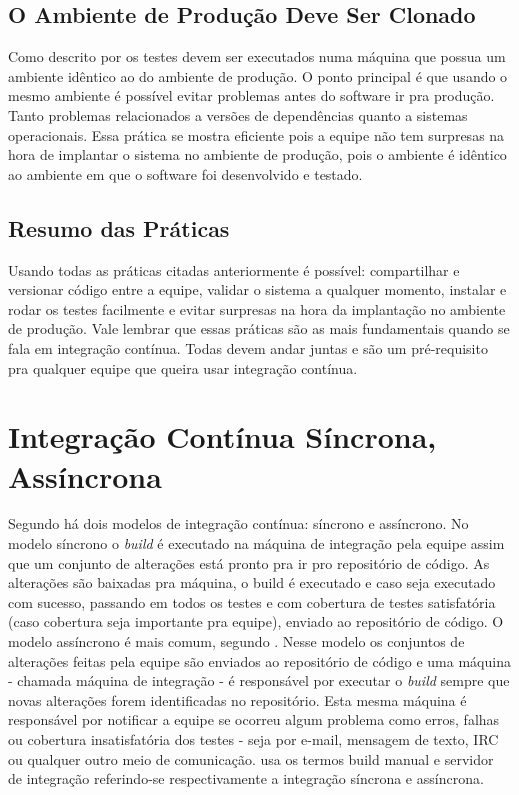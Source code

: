 \documentclass[10pt,a4paper,font=plain]{abnt}
\begin{document}
\subsection{O Ambiente de Produção Deve Ser Clonado}

Como descrito por  os testes devem ser executados numa máquina que possua um ambiente idêntico ao do ambiente de produção. O ponto principal é que usando o mesmo ambiente é possível evitar problemas antes do software ir pra produção. Tanto problemas relacionados a versões de dependências quanto a sistemas operacionais. Essa prática se mostra eficiente pois a equipe não tem surpresas na hora de implantar o sistema no ambiente de produção, pois o ambiente é idêntico ao ambiente em que o software foi desenvolvido e testado.


\subsection{Resumo das Práticas}

Usando todas as práticas citadas anteriormente é possível: compartilhar e versionar código entre a equipe, validar o sistema a qualquer momento, instalar e rodar os testes facilmente e evitar surpresas na hora da implantação no ambiente de produção. Vale lembrar que essas práticas são as mais fundamentais quando se fala em integração contínua. Todas devem andar juntas e são um pré-requisito pra qualquer equipe que queira usar integração contínua.



\section{Integração Contínua Síncrona, Assíncrona}

Segundo  há dois modelos de integração contínua: síncrono e assíncrono.
No modelo síncrono o \textit{build} é executado na máquina de integração pela equipe assim que um conjunto de alterações está pronto pra ir pro repositório de código. As alterações são baixadas pra máquina, o build é executado e caso seja executado com sucesso, passando em todos os testes e com cobertura de testes satisfatória (caso cobertura seja importante pra equipe), enviado ao repositório de código.
O modelo assíncrono é mais comum, segundo . Nesse modelo os conjuntos de alterações feitas pela equipe são enviados ao repositório de código e uma máquina - chamada máquina de integração - é responsável por executar o \textit{build} sempre que novas alterações forem identificadas no repositório. Esta mesma máquina é responsável por notificar a equipe se ocorreu algum problema como erros, falhas ou cobertura insatisfatória dos testes - seja por e-mail, mensagem de texto, IRC ou qualquer outro meio de comunicação.  usa os termos build manual e servidor de integração referindo-se respectivamente a integração síncrona e assíncrona.
\end{document}
